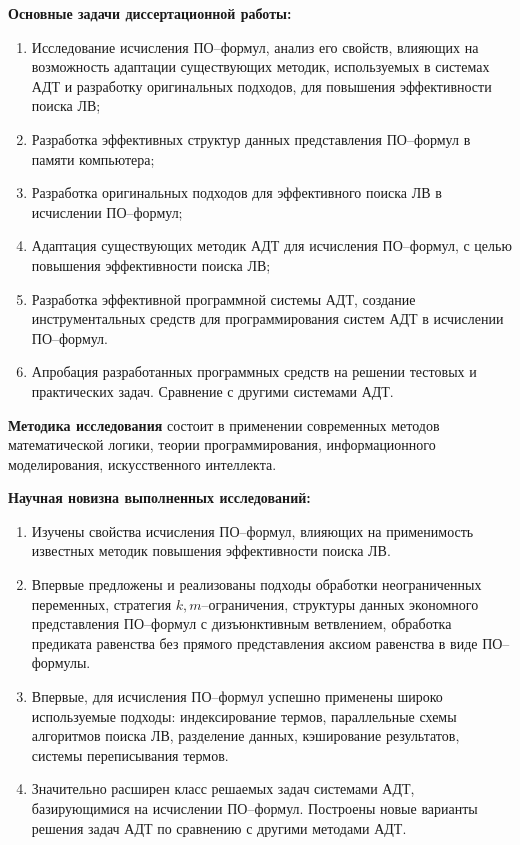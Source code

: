 \documentclass[a4paper]{report}
\begin{document}
\textbf{Основные задачи диссертационной работы:}
\begin{enumerate}
\item Исследование исчисления ПО--формул, анализ его свойств, влияющих на возможность адаптации существующих методик, используемых в системах АДТ и разработку оригинальных подходов, для повышения эффективности поиска ЛВ;
\item Разработка эффективных структур данных представления ПО--формул в памяти компьютера;
\item Разработка оригинальных подходов для эффективного поиска ЛВ в исчислении ПО--формул;
\item Адаптация существующих методик АДТ для исчисления ПО--формул, с целью повышения эффективности поиска ЛВ;
\item Разработка эффективной программной системы АДТ, создание инструментальных средств для программирования систем АДТ в исчислении ПО--формул.
\item Апробация разработанных программных средств на решении тестовых и практических задач. Сравнение с другими системами АДТ.
\end{enumerate}

\textbf{Методика исследования} состоит в применении современных методов математической логики, теории программирования, информационного моделирования, искусственного интеллекта.


\textbf{Научная новизна выполненных исследований:}
\begin{enumerate}
\item Изучены свойства исчисления ПО--формул, влияющих на применимость известных методик повышения эффективности поиска ЛВ.
\item Впервые предложены и реализованы подходы обработки неограниченных переменных, стратегия $k,m$--ограничения, структуры данных экономного представления ПО--формул с дизъюнктивным ветвлением, обработка предиката равенства без прямого представления аксиом равенства в виде ПО--формулы.
\item Впервые, для исчисления ПО--формул успешно применены широко используемые подходы: индексирование термов, параллельные схемы алгоритмов поиска ЛВ, разделение данных, кэширование результатов, системы переписывания термов.
\item Значительно расширен класс решаемых задач системами АДТ, базирующимися на исчислении ПО--формул. Построены новые варианты решения задач АДТ по сравнению с другими методами АДТ.
\end{enumerate}
\end{document}
